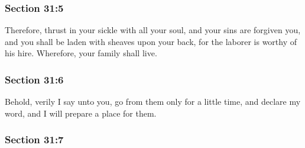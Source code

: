 
	\subsubsection{Section 31:5} %
		\label{DC31-5}

		Therefore, thrust in your sickle with all your soul, and your sins are forgiven you, and you shall be laden with sheaves upon your back, for the laborer is worthy of his hire. Wherefore, your family shall live.


	\subsubsection{Section 31:6} %
		\label{DC31-6}

		Behold, verily I say unto you, go from them only for a little time, and declare my word, and I will prepare a place for them.


	\subsubsection{Section 31:7} %
		\label{DC31-7}

